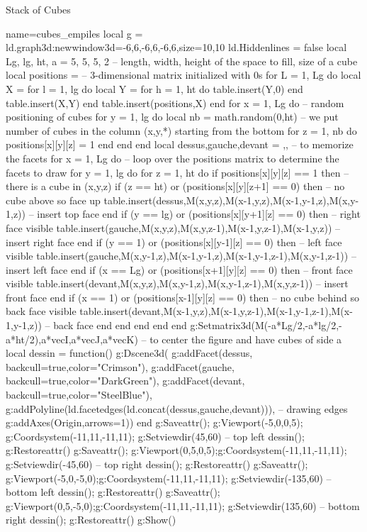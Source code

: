 \begin{demo}{Stack of Cubes}
\begin{luadraw}{name=cubes_empiles}
local g = ld.graph3d:new{window3d={-6,6,-6,6,-6,6},size={10,10}}
ld.Hiddenlines = false
local Lg, lg, ht, a = 5, 5, 5, 2 -- length, width, height of the space to fill, size of a cube
local positions = {} -- 3-dimensional matrix initialized with 0s
for L = 1, Lg do
    local X = {}
    for l = 1, lg do
        local Y = {}
        for h = 1, ht do table.insert(Y,0) end
        table.insert(X,Y)
    end
    table.insert(positions,X)
end
for x = 1, Lg do  -- random positioning of cubes
    for y = 1, lg do
        local nb = math.random(0,ht) -- we put number of cubes in the column (x,y,*) starting from the bottom
        for z = 1, nb do positions[x][y][z] = 1 end
    end
end
local dessus,gauche,devant = {},{},{} -- to memorize the facets
for x = 1, Lg do -- loop over the positions matrix to determine the facets to draw
    for y = 1, lg do
        for z = 1, ht do
            if positions[x][y][z] == 1 then -- there is a cube in  (x,y,z)
                if (z == ht) or (positions[x][y][z+1] == 0) then -- no cube above so face up
                    table.insert(dessus,{M(x,y,z),M(x-1,y,z),M(x-1,y-1,z),M(x,y-1,z)}) -- insert top face
                end
                if (y == lg) or (positions[x][y+1][z] == 0) then -- right face visible
                    table.insert(gauche,{M(x,y,z),M(x,y,z-1),M(x-1,y,z-1),M(x-1,y,z)}) -- insert right face
                end
                if (y == 1) or (positions[x][y-1][z] == 0) then -- left face visible
                    table.insert(gauche,{M(x,y-1,z),M(x-1,y-1,z),M(x-1,y-1,z-1),M(x,y-1,z-1)}) -- insert left face
                end                    
                if (x == Lg) or (positions[x+1][y][z] == 0) then -- front face visible
                    table.insert(devant,{M(x,y,z),M(x,y-1,z),M(x,y-1,z-1),M(x,y,z-1)}) -- insert front face
                end
                if (x == 1) or (positions[x-1][y][z] == 0) then -- no cube behind so back face visible
                    table.insert(devant,{M(x-1,y,z),M(x-1,y,z-1),M(x-1,y-1,z-1),M(x-1,y-1,z)}) -- back face
                end
            end
        end
    end
end
g:Setmatrix3d({M(-a*Lg/2,-a*lg/2,-a*ht/2),a*vecI,a*vecJ,a*vecK}) -- to center the figure and have cubes of side a
local dessin = function()
    g:Dscene3d(
        g:addFacet(dessus, {backcull=true,color="Crimson"}), g:addFacet(gauche, {backcull=true,color="DarkGreen"}),
        g:addFacet(devant, {backcull=true,color="SteelBlue"}),
        g:addPolyline(ld.facetedges(ld.concat(dessus,gauche,devant))), -- drawing edges
        g:addAxes(Origin,{arrows=1}))
end
g:Saveattr(); g:Viewport(-5,0,0,5); g:Coordsystem(-11,11,-11,11); g:Setviewdir(45,60) -- top left
 dessin(); g:Restoreattr()
g:Saveattr(); g:Viewport(0,5,0,5);g:Coordsystem(-11,11,-11,11); g:Setviewdir(-45,60) -- top right
dessin(); g:Restoreattr()
g:Saveattr(); g:Viewport(-5,0,-5,0);g:Coordsystem(-11,11,-11,11); g:Setviewdir(-135,60) -- bottom left
dessin(); g:Restoreattr()
g:Saveattr(); g:Viewport(0,5,-5,0);g:Coordsystem(-11,11,-11,11); g:Setviewdir(135,60) -- bottom right
dessin(); g:Restoreattr()
g:Show()
\end{luadraw}
\end{demo}


